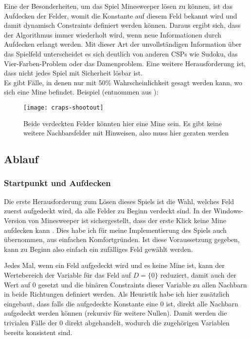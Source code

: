 Eine der Besonderheiten, um das Spiel Minesweeper lösen zu können, ist das Aufdecken der Felder, womit die Konstante auf diesem Feld
bekannt wird und damit dynamisch Constraints definiert werden können. Daraus ergibt sich, dass der Algorithmus immer wiederholt wird,
wenn neue Informationen durch Aufdecken erlangt werden. Mit dieser Art der unvollständigen Information über das Spielfeld unterscheidet es
sich deutlich von anderen CSPs wie Sudoku, das Vier-Farben-Problem oder das Damenproblem.
Eine weitere Herausforderung ist, dass nicht jedes Spiel mit Sicherheit lösbar ist.\\ Es gibt Fälle, in denen nur mit 50\% Wahrscheinlichkeit
gesagt werden kann, wo sich eine Mine befindet. Beispiel (entnommen aus \cite{AlgoApproaches}):
\begin{figure}[!htb]
    \centering
    \texttt{[image: craps-shootout]}
    \caption{Beide verdeckten Felder könnten hier eine Mine sein. Es gibt keine weitere Nachbarsfelder mit Hinweisen, also muss hier geraten
    werden}\label{craps}
\end{figure}

\subsection{Ablauf}
\subsubsection{Startpunkt und Aufdecken}

Die erste Herausforderung zum Lösen dieses Spiels ist die Wahl, welches Feld zuerst aufgedeckt wird, da alle Felder zu Beginn verdeckt sind.
In der Windows-Version von Minesweeper ist sichergestellt, dass der erste Klick keine Mine aufdecken kann \cite{MS}. Dies habe ich für 
meine Implementierung des Spiels auch übernommen, aus einfachen Komfortgründen. Ist diese Voraussetzung gegeben, kann zu Beginn also einfach
ein zufälliges Feld gewählt werden.

Jedes Mal, wenn ein Feld aufgedeckt wird und es keine Mine ist, kann der Wertebereich der Variable für
das Feld auf $D=\{0\}$ reduziert, damit auch der Wert auf 0 gesetzt und die binären Constraints dieser Variable zu allen Nachbarn in beide
Richtungen definiert werden. Als Heuristik habe ich hier zusätzlich eingebaut, dass falls die aufgedeckte Konstante eine 0 ist, direkt
alle Nachbarn aufgedeckt werden können (rekursiv für weitere Nullen). Damit werden die trivialen Fälle der 0 direkt abgehandelt, wodurch
die zugehörigen Variablen bereits konsistent sind.


